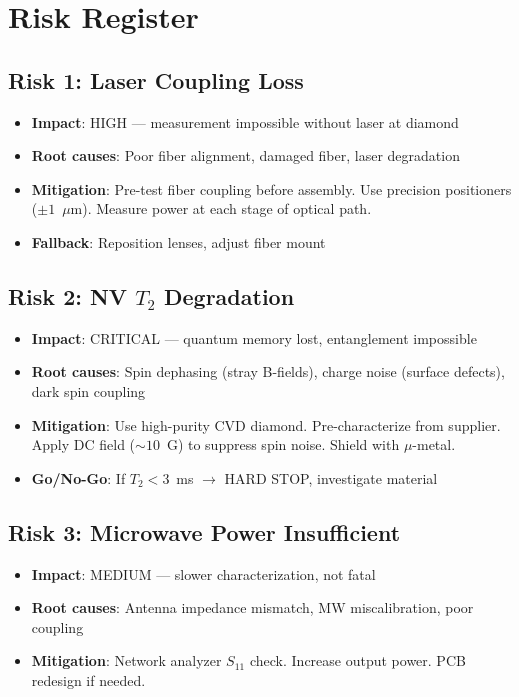 \documentclass[11pt,a4paper,openany]{book}
\begin{document}
\section{Risk Register}

\subsection{Risk 1: Laser Coupling Loss}

\begin{itemize}[nosep]
  \item \textbf{Impact}: HIGH --- measurement impossible without laser at diamond
  \item \textbf{Root causes}: Poor fiber alignment, damaged fiber, laser degradation
  \item \textbf{Mitigation}: Pre-test fiber coupling before assembly. Use precision positioners ($\pm 1$~$\mu$m). Measure power at each stage of optical path.
  \item \textbf{Fallback}: Reposition lenses, adjust fiber mount
\end{itemize}

\subsection{Risk 2: NV $T_2$ Degradation}

\begin{itemize}[nosep]
  \item \textbf{Impact}: CRITICAL --- quantum memory lost, entanglement impossible
  \item \textbf{Root causes}: Spin dephasing (stray B-fields), charge noise (surface defects), dark spin coupling
  \item \textbf{Mitigation}: Use high-purity CVD diamond. Pre-characterize from supplier. Apply DC field (${\sim}10$~G) to suppress spin noise. Shield with $\mu$-metal.
  \item \textbf{Go/No-Go}: If $T_2 < 3$~ms $\to$ HARD STOP, investigate material
\end{itemize}

\subsection{Risk 3: Microwave Power Insufficient}

\begin{itemize}[nosep]
  \item \textbf{Impact}: MEDIUM --- slower characterization, not fatal
  \item \textbf{Root causes}: Antenna impedance mismatch, MW miscalibration, poor coupling
  \item \textbf{Mitigation}: Network analyzer $S_{11}$ check. Increase output power. PCB redesign if needed.
\end{itemize}
\end{document}
